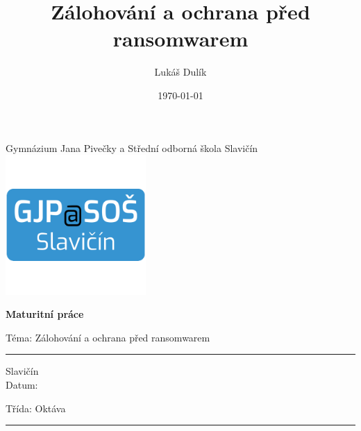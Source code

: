 \documentclass[a4paper,12pt, oneside]{book}
\title{Zálohování a ochrana před ransomwarem}
\author{Lukáš Dulík}
\date{\today} %
\def\topic{Zálohování a ochrana před ransomwarem}
\def\schoolclass{Oktáva}
\begin{document}

\begin{titlepage}
    \begin{center}
        \vspace*{1cm}

        \Huge
		Gymnázium Jana Pivečky a Střední odborná škola Slavičín \\

		\includegraphics[width=0.4\textwidth]{img/gjp.png}

        \textbf{Maturitní práce}

        \vspace{0.5cm}
        \LARGE
        Téma: \topic
    \end{center}

	\vspace{1.5cm}

	\vfill

	\vspace{0.8cm}

	\vspace{5pt}
	\hrule
	\vspace{6pt}

	\Large

	\makeatletter
	\begin{multicols}{2}
		\noindent
		Slavičín \\
		Datum: \@date

	\columnbreak
		\noindent
		\null\hfill Třída: \schoolclass \\
		\null\hfill \@author
	\end{multicols}

	\makeatother

	\vspace{5pt}

	\hrule

\end{titlepage}
\end{document}
